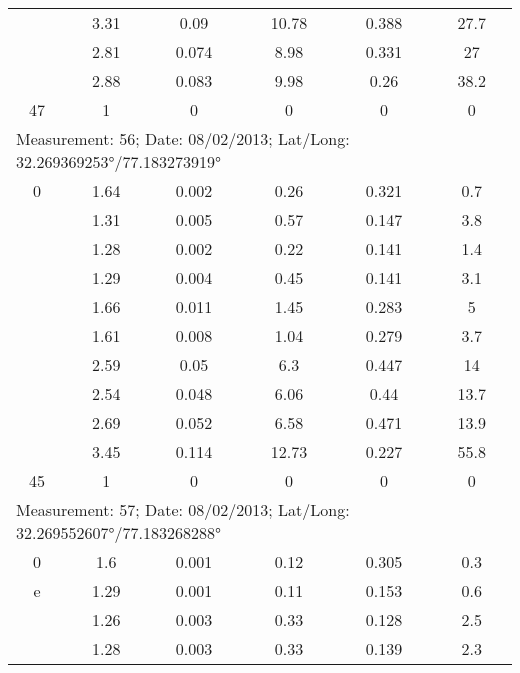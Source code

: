 \begin{longtable}{cccccc}
		& 3.31  & 0.09  & 10.78 & 0.388 & 27.7 \\
		
		& 2.81  & 0.074 & 8.98  & 0.331 & 27 \\
		
		& 2.88  & 0.083 & 9.98  & 0.26  & 38.2 \\
		
		47    & 1     & 0     & 0     & 0     & 0 \\
		\midrule
		\multicolumn{6}{l}{Measurement: 56; Date: 08/02/2013;
			Lat/Long: 32.269369253°/77.183273919°} \\		
		\midrule
		0     & 1.64  & 0.002 & 0.26  & 0.321 & 0.7 \\
		
		& 1.31  & 0.005 & 0.57  & 0.147 & 3.8 \\
		
		& 1.28  & 0.002 & 0.22  & 0.141 & 1.4 \\
		
		& 1.29  & 0.004 & 0.45  & 0.141 & 3.1 \\
		
		& 1.66  & 0.011 & 1.45  & 0.283 & 5 \\
		
		& 1.61  & 0.008 & 1.04  & 0.279 & 3.7 \\
		
		& 2.59  & 0.05  & 6.3   & 0.447 & 14 \\
		
		& 2.54  & 0.048 & 6.06  & 0.44  & 13.7 \\
		
		& 2.69  & 0.052 & 6.58  & 0.471 & 13.9 \\
		
		& 3.45  & 0.114 & 12.73 & 0.227 & 55.8 \\
		
		45    & 1     & 0     & 0     & 0     & 0 \\
		\midrule
		\multicolumn{6}{l}{Measurement: 57; Date: 08/02/2013;
			Lat/Long: 32.269552607°/77.183268288°} \\		
		\midrule
		0     & 1.6   & 0.001 & 0.12  & 0.305 & 0.3 \\e
		
		& 1.29  & 0.001 & 0.11  & 0.153 & 0.6 \\
		
		& 1.26  & 0.003 & 0.33  & 0.128 & 2.5 \\
		
		& 1.28  & 0.003 & 0.33  & 0.139 & 2.3 \\
		

\end{longtable}
